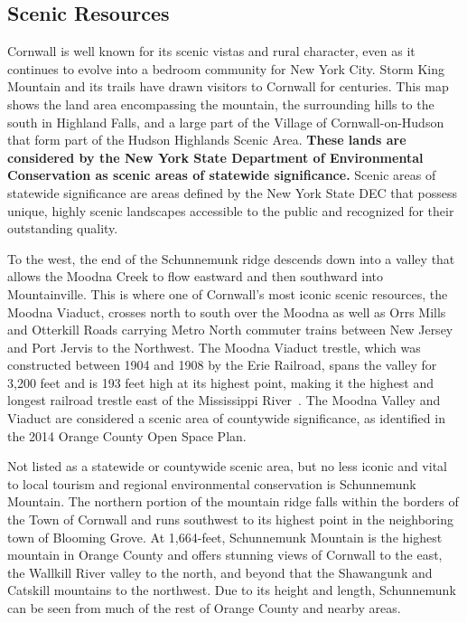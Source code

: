 \subsection*{Scenic Resources}\label{subsec:scenic}
Cornwall is well known for its scenic vistas and rural character, even as it 
continues to evolve into a bedroom community for New York City. Storm King 
Mountain and its trails have drawn visitors to Cornwall for centuries. This map 
shows the land area encompassing the mountain, the surrounding hills to the 
south in Highland Falls, and a large part of the Village of Cornwall-on-Hudson 
that form part of the Hudson Highlands Scenic Area. \textbf{These lands are 
considered by the New York State Department of Environmental Conservation as 
scenic areas of statewide significance.} Scenic areas of statewide significance 
are areas defined by the New York State DEC that possess unique, highly scenic 
landscapes accessible to the public and recognized for their outstanding 
quality.
\par
To the west, the end of the Schunnemunk ridge descends down into a valley that 
allows the Moodna Creek to flow eastward and then southward into Mountainville. 
This is where one of Cornwall’s most iconic scenic resources, the Moodna 
Viaduct, crosses north to south over the Moodna as well as Orrs Mills and 
Otterkill Roads carrying Metro North commuter trains between New Jersey and 
Port Jervis to the Northwest. The Moodna Viaduct trestle, which was constructed 
between 1904 and 1908 by the Erie Railroad, spans the valley for 3,200 feet and 
is 193 feet high at its highest point, making it the highest and longest 
railroad trestle east of the Mississippi River~\citep{moseronline}. The Moodna 
Valley and Viaduct are considered a scenic area of countywide significance, 
as identified in the 2014 Orange County Open Space Plan. 
\par
Not listed as a statewide or countywide scenic area, but no less iconic and 
vital to local tourism and regional environmental conservation is Schunnemunk 
Mountain. The northern portion of the mountain ridge falls within the borders 
of the Town of Cornwall and runs southwest to its highest point in the 
neighboring town of Blooming Grove. At 1,664-feet, Schunnemunk Mountain is the 
highest mountain in Orange County and offers stunning views of Cornwall to the 
east, the Wallkill River valley to the north, and beyond that the Shawangunk and 
Catskill mountains to the northwest. Due to its height and length, Schunnemunk 
can be seen from much of the rest of Orange County and nearby areas.